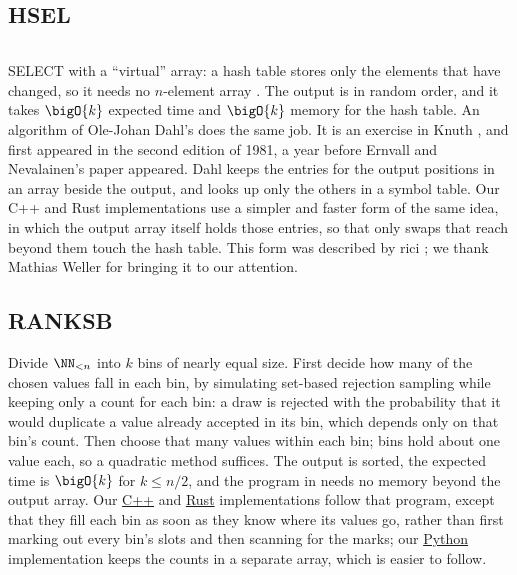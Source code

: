 \documentclass[letterpaper,11pt]{article}
\newcommand{\repo}[2]{\href{https://github.com/ciphergoth/sansreplace/blob/paper_v1/#1}{#2}}
\begin{document}
\subsection{HSEL}
\inputminted{Python}{code/hsel.py}
SELECT with a ``virtual'' array: a hash table stores only the elements
that have changed, so it needs no \(n\)-element array
\cite{hsel}. The output is in random order, and it takes \(\bigO{k}\)
expected time and \(\bigO{k}\) memory for the hash table. An algorithm
of Ole-Johan Dahl's does the same job. It is an exercise in Knuth
\cite[\S 3.4.2, exercise 15]{taocp2}, and first appeared in the second
edition of 1981, a year before Ernvall and Nevalainen's paper appeared.
Dahl keeps the entries for the output positions in an array beside the
output, and looks up only the others in a symbol table. Our C++ and
Rust implementations use a simpler and faster form of the same idea,
in which the output array itself holds those entries, so that only
swaps that reach beyond them touch the hash table. This form was
described by rici \cite{rici}; we thank Mathias Weller for bringing it
to our attention.

\subsection{RANKSB}
Divide \(\NN_{<n}\) into \(k\) bins of nearly equal size. First
decide how many of the chosen values fall in each bin, by simulating
set-based rejection sampling while keeping only a count for each bin:
a draw is rejected with the probability that it would duplicate a value
already accepted in its bin, which depends only on that bin's count.
Then choose that many values within each bin; bins hold about one value
each, so a quadratic method suffices. The output is sorted, the expected
time is \(\bigO{k}\) for \(k \leq n/2\), and the program in
\cite[Chapter 4]{nijenhuiswilf} needs no memory beyond the output
array. Our \repo{cpp/ranksb.cpp}{C++} and
\repo{rust/src/algorithms/ranksb.rs}{Rust} implementations follow that
program, except that they fill each bin as soon as they know where its
values go, rather than first marking out every bin's slots and then
scanning for the marks; our \repo{python/algorithms/ranksb.py}{Python}
implementation keeps the counts in a separate array, which is easier to
follow.
\end{document}
